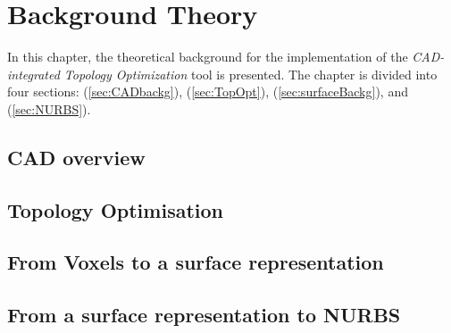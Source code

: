 \chapter{Background Theory}
In this chapter, the theoretical background for the implementation of the \textit{CAD-integrated Topology Optimization} tool is presented. The chapter is divided into four sections: \emph{} (\autoref{sec:CADbackg}), \emph{} (\autoref{sec:TopOpt}), \emph{} (\autoref{sec:surfaceBackg}), and \emph{} (\autoref{sec:NURBS}).
\label{chapter:Background}

\section{CAD overview}
\label{sec:CADbackg}


\section{Topology Optimisation}
\label{sec:TopOpt}


%

\section{From Voxels to a surface representation}
\label{sec:surfaceBackg}


\section{From a surface representation to NURBS}
\label{sec:NURBS}






